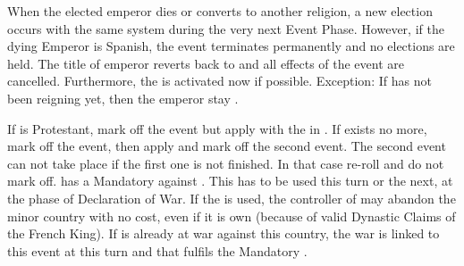 \effetlong
\aparag When the elected emperor dies or converts to another religion, a new
election occurs with the same system during the very next Event Phase.
\aparag However, if the dying Emperor is Spanish, the event terminates
permanently and no elections are held. The title of emperor reverts back to
\AUSaus and all effects of the event are cancelled. Furthermore, the
 is activated now if possible.
\bparag Exception: If  has not been reigning yet, then the
emperor stay \HIS.





\aparag If \FRA is Protestant, mark off the event but apply \RD with the
\REVOLT in \FRA.
\aparag If \paysNaples exists no more, mark off the event, then apply and mark
off the second event.
\aparag The second event can not take place if the first one is not
finished. In that case re-roll and do not mark off. \phevnt
\aparag \FRA has a Mandatory \CB against \paysNaples. This \CB has to be used
this turn or the next, at the phase of Declaration of War. If the \CB is used,
the controller of \paysNaples may abandon the minor country with no cost, even
if it is own \VASSAL (because of valid Dynastic Claims of the French King).
\aparag If \FRA is already at war against this country, the war is linked to
this event at this turn and that fulfils the Mandatory \CB.

